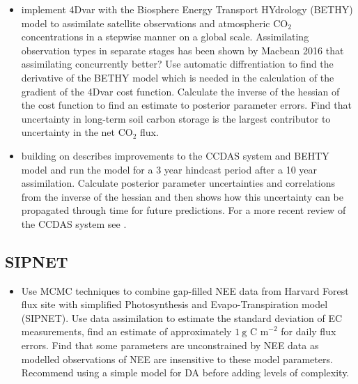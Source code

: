 \documentclass[12pt, a4paper]{article}
\begin{document}
\begin{itemize}

\item \citet{rayner2005two} implement 4Dvar with the Biosphere Energy Transport HYdrology (BETHY) model \citep{knorr2001uncertainties} to assimilate satellite observations and atmospheric CO\(_2\) concentrations in a stepwise manner on a global scale. Assimilating observation types in separate stages has been shown by Macbean 2016 that assimilating concurrently better? Use automatic diffrentiation to find the derivative of the BETHY model which is needed in the calculation of the gradient of the 4Dvar cost function. Calculate the inverse of the hessian of the cost function to find an estimate to posterior parameter errors. Find that uncertainty in long-term soil carbon storage is the largest contributor to uncertainty in the net CO\(_2\) flux.

\item \citet{scholze2007propagating} building on  \citet{rayner2005two} describes improvements to the CCDAS system and BEHTY model and run the model for a 3 year hindcast period after a 10 year assimilation. Calculate posterior parameter uncertainties and correlations from the inverse of the hessian and then shows how this uncertainty can be propagated through time for future predictions. For a more recent review of the CCDAS system see \citet{Kaminski2013}.

\end{itemize}

\subsection{SIPNET}

\begin{itemize}

\item \citet{braswell2005estimating} Use MCMC techniques to combine gap-filled NEE data from Harvard Forest flux site with simplified Photosynthesis and Evapo-Transpiration model (SIPNET). Use data assimilation to estimate the standard deviation of EC measurements, find an estimate of approximately \(1~\text{g C m}^{-2}\) for daily flux errors. Find that some parameters are unconstrained by NEE data as modelled observations of NEE are insensitive to these model parameters. Recommend using a simple model for DA before adding levels of complexity.  

\end{itemize}
 
\end{document}

